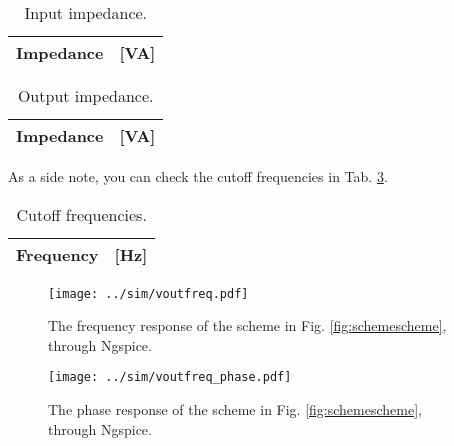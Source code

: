 \begin{table}[H]
    \centering
    \begin{tabular}{|c|c|}
    	\hline
    	Impedance & [VA]\\ 
    	\hline
         
    \end{tabular}
    \caption{Input impedance.}
    \label{tab:inputimp}
\end{table}

\begin{table}[H]
    \centering
    \begin{tabular}{|c|c|}
    	\hline
    	Impedance & [VA]\\ 
    	\hline
         
    \end{tabular}
    \caption{Output impedance.}
    \label{tab:outputimp}
\end{table}

As a side note, you can check the cutoff frequencies in Tab. \ref{tab:cutoff}.

\begin{table}[H]
    \centering
    \begin{tabular}{|c|c|}
        \hline
        Frequency & [Hz]\\ 
        \hline
         
    \end{tabular}
    \caption{Cutoff frequencies.}
    \label{tab:cutoff}
\end{table}

\begin{figure}[H]
    \centering
    \texttt{[image: ../sim/voutfreq.pdf]}
    \caption{The frequency response of the scheme in Fig. \ref{fig:schemescheme}, through Ngspice.}
    \label{fig:ngresp}
\end{figure}

\begin{figure}[H]
    \centering
    \texttt{[image: ../sim/voutfreq\_phase.pdf]}
    \caption{The phase response of the scheme in Fig. \ref{fig:schemescheme}, through Ngspice.}
    \label{fig:ngphase}
\end{figure}
